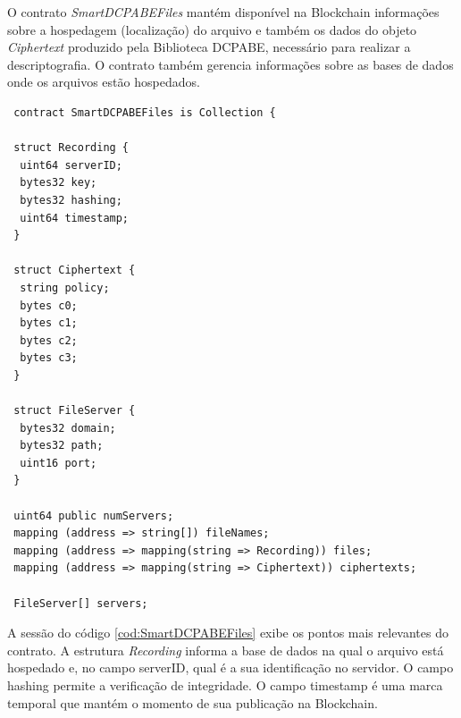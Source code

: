 \documentclass[a4paper,11pt]{article}
\begin{document}


O contrato \emph{SmartDCPABEFiles} mantém disponível na Blockchain informações sobre a hospedagem (localização) do arquivo e também os dados do objeto \emph{Ciphertext} produzido pela Biblioteca DCPABE, necessário para realizar a descriptografia.
O contrato também gerencia informações sobre as bases de dados onde os arquivos estão hospedados.


\begin{lstlisting}
 contract SmartDCPABEFiles is Collection {

 struct Recording {
  uint64 serverID;
  bytes32 key;
  bytes32 hashing;
  uint64 timestamp;
 }

 struct Ciphertext {
  string policy;
  bytes c0;
  bytes c1;
  bytes c2;
  bytes c3;
 }

 struct FileServer {
  bytes32 domain;
  bytes32 path;
  uint16 port;
 }

 uint64 public numServers;
 mapping (address => string[]) fileNames;
 mapping (address => mapping(string => Recording)) files;
 mapping (address => mapping(string => Ciphertext)) ciphertexts;

 FileServer[] servers;
\end{lstlisting}


A sessão do código \ref{cod:SmartDCPABEFiles} exibe os pontos mais relevantes do contrato.
A estrutura \emph{Recording} informa a base de dados na qual o arquivo está hospedado e, no campo serverID, qual é a sua identificação no servidor.
O campo hashing permite a verificação de integridade.
O campo timestamp é uma marca temporal que mantém o momento de sua publicação na Blockchain. %
\end{document}
